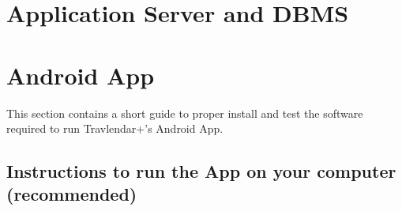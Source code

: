 \section{Application Server and DBMS}
\label{sect:Application Server and DBMS}

\section{Android App}
\label{sect:Android App}
This section contains a short guide to proper install and test the software required to run Travlendar+'s Android App.\\

 
\subsection{Instructions to run the App on your computer (recommended)}
\label{subsect:Android App}
